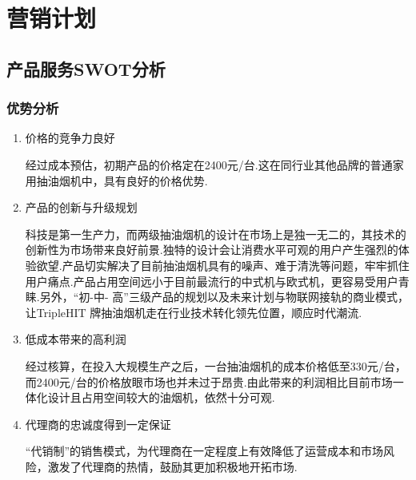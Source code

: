 ﻿\section{营销计划}

\subsection{产品服务SWOT分析}
\subsubsection{优势分析}
\begin{enumerate}
\item 价格的竞争力良好

      经过成本预估，初期产品的价格定在2400元/台.这在同行业其他品牌的普通家用抽油烟机中，具有良好的价格优势.

\item 产品的创新与升级规划

      科技是第一生产力，而两级抽油烟机的设计在市场上是独一无二的，其技术的创新性为市场带来良好前景.独特的设计会让消费水平可观的用户产生强烈的体验欲望.产品切实解决了目前抽油烟机具有的噪声、难于清洗等问题，牢牢抓住用户痛点.产品占用空间远小于目前最流行的中式机与欧式机，更容易受用户青睐.另外，“初-中- 高”三级产品的规划以及未来计划与物联网接轨的商业模式，让TripleHIT 牌抽油烟机走在行业技术转化领先位置，顺应时代潮流.

\item 低成本带来的高利润

      经过核算，在投入大规模生产之后，一台抽油烟机的成本价格低至330元/台，而2400元/台的价格放眼市场也并未过于昂贵.由此带来的利润相比目前市场一体化设计且占用空间较大的油烟机，依然十分可观.

\item 代理商的忠诚度得到一定保证

      “代销制”的销售模式，为代理商在一定程度上有效降低了运营成本和市场风险，激发了代理商的热情，鼓励其更加积极地开拓市场.

\end{enumerate}

